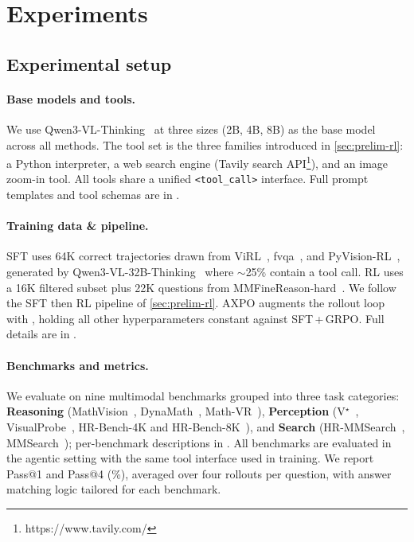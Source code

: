 \section{Experiments}
\label{sec:experiments}

\subsection{Experimental setup}
\label{sec:setup}

\paragraph{Base models and tools.}
We use Qwen3-VL-Thinking~\citep{Qwen3VL} at three sizes (2B, 4B, 8B) as the base model across all methods. The tool set is the three families introduced in \autoref{sec:prelim-rl}: a Python interpreter, a web search engine (Tavily search API\footnote{https://www.tavily.com/}), and an image zoom-in tool. 
All tools share a unified \texttt{<tool\_call>} interface. Full prompt templates and tool schemas are in .

\paragraph{Training data \& pipeline.}
SFT uses 64K correct trajectories drawn from ViRL~\citep{virl}, fvqa~\citep{fvqa}, and PyVision-RL~\citep{pyvision-rl}, generated by Qwen3-VL-32B-Thinking~\citep{Qwen3VL} where $\sim$25\% contain a tool call. RL uses a 16K filtered subset plus 22K questions from MMFineReason-hard~\citep{mmfinereason}.
We follow the SFT then RL pipeline of \autoref{sec:prelim-rl}. AXPO augments the rollout loop with \toolresample, holding all other hyperparameters constant against SFT\,+\,GRPO. Full details are in .

\paragraph{Benchmarks and metrics.}
We evaluate on nine multimodal benchmarks grouped into three task categories: \textbf{Reasoning} (MathVision~\citep{mathvision}, DynaMath~\citep{dynamath}, Math-VR~\citep{mathvr}), \textbf{Perception} (V$^{\star}$~\citep{vstar}, VisualProbe~\citep{mini-o3}, HR-Bench-4K and HR-Bench-8K~\citep{HRBench}), and \textbf{Search} (HR-MMSearch~\citep{hrmmsearch}, MMSearch~\citep{mmsearch}); per-benchmark descriptions in . All benchmarks are evaluated in the agentic setting with the same tool interface used in training. We report Pass@1 and Pass@4 (\%), averaged over four rollouts per question, with answer matching logic tailored for each benchmark.

